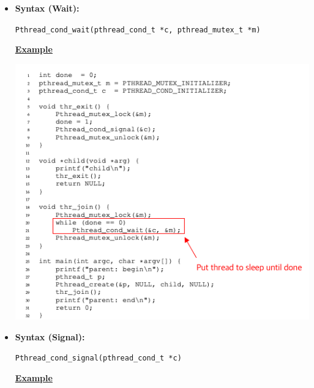 \documentclass[12pt]{article}
\begin{document}
\begin{enumerate}[1.]
\begin{enumerate}[a)]
\begin{itemize}
\begin{itemize}
                \item

                \textbf{Syntax (Wait):}

                \bigskip

                \texttt{Pthread\_cond\_wait(pthread\_cond\_t *c, pthread\_mutex\_t *m)}

                \bigskip

                \underline{\textbf{Example}}

                \begin{center}
                \includegraphics[width=\linewidth]{images/midterm_2_solution_17.png}
                \end{center}
                \item \textbf{Syntax (Signal):}

                \bigskip

                \texttt{Pthread\_cond\_signal(pthread\_cond\_t *c)}

                \underline{\textbf{Example}}


\end{itemize}
\end{itemize}
\end{enumerate}
\end{enumerate}
\end{document}

